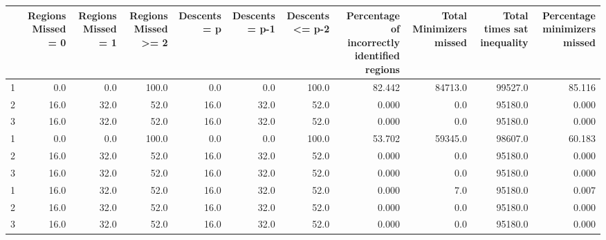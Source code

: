 \begin{tabular}{lrrrrrrrrrr}
\toprule
{} &  Regions Missed = 0 &  Regions Missed = 1 &  Regions Missed >= 2 &  Descents = p &  Descents = p-1 &  Descents <= p-2 &  Percentage of incorrectly identified regions &  Total Minimizers missed &  Total times sat inequality &  Percentage minimizers missed \\
\midrule
1 &                 0.0 &                 0.0 &                100.0 &           0.0 &             0.0 &            100.0 &                                        82.442 &                  84713.0 &                     99527.0 &                        85.116 \\
2 &                16.0 &                32.0 &                 52.0 &          16.0 &            32.0 &             52.0 &                                         0.000 &                      0.0 &                     95180.0 &                         0.000 \\
3 &                16.0 &                32.0 &                 52.0 &          16.0 &            32.0 &             52.0 &                                         0.000 &                      0.0 &                     95180.0 &                         0.000 \\
1 &                 0.0 &                 0.0 &                100.0 &           0.0 &             0.0 &            100.0 &                                        53.702 &                  59345.0 &                     98607.0 &                        60.183 \\
2 &                16.0 &                32.0 &                 52.0 &          16.0 &            32.0 &             52.0 &                                         0.000 &                      0.0 &                     95180.0 &                         0.000 \\
3 &                16.0 &                32.0 &                 52.0 &          16.0 &            32.0 &             52.0 &                                         0.000 &                      0.0 &                     95180.0 &                         0.000 \\
1 &                16.0 &                32.0 &                 52.0 &          16.0 &            32.0 &             52.0 &                                         0.000 &                      7.0 &                     95180.0 &                         0.007 \\
2 &                16.0 &                32.0 &                 52.0 &          16.0 &            32.0 &             52.0 &                                         0.000 &                      0.0 &                     95180.0 &                         0.000 \\
3 &                16.0 &                32.0 &                 52.0 &          16.0 &            32.0 &             52.0 &                                         0.000 &                      0.0 &                     95180.0 &                         0.000 \\
\bottomrule
\end{tabular}
